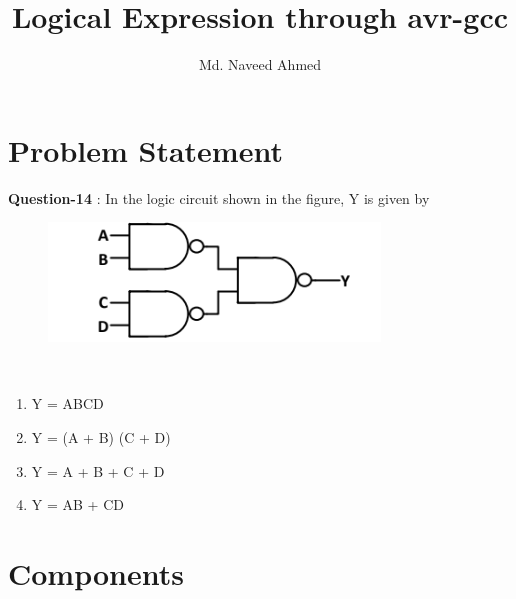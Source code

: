 \documentclass[journal,12pt,twocolumn]{IEEEtran}
\begin{document}
%

\theoremstyle{definition}
\newtheorem{theorem}{Theorem}[section]
\newtheorem{problem}{Problem}
\newtheorem{proposition}{Proposition}[section]
\newtheorem{lemma}{Lemma}[section]
\newtheorem{corollary}[theorem]{Corollary}
\newtheorem{example}{Example}[section]
\newtheorem{definition}{Definition}[section]
\newcommand{\BEQA}{\begin{eqnarray}}
\newcommand{\EEQA}{\end{eqnarray}}
\newcommand{\define}{\stackrel{\triangle}{=}}
\vspace{2cm}
\title{ 
Logical Expression through avr-gcc
}

\author{Md. Naveed Ahmed}


\maketitle
\tableofcontents
\bigskip
%
\section{Problem Statement}



\textbf{Question-14}  : In the logic circuit shown in the figure, Y is given by
\begin{figure}[h]
    \centering
    \includegraphics[scale=0.8]{../figures/log_exp.png}\\
\end{figure}\\
\begin{enumerate}[label=(\alph*)]
    \item Y = ABCD
    \item Y = (A + B) (C + D)
    \item Y = A + B + C + D
    \item Y = AB + CD
\end{enumerate}

\section{\textbf{Components}}

\begin{table}[!h]
\centering
\caption{}
\label{table:7447_disp}
\end{table}
\end{document}
